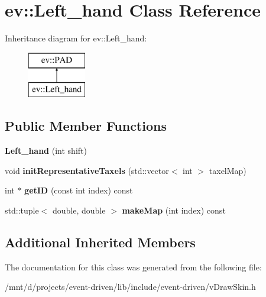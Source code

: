 \hypertarget{classev_1_1Left__hand}{}\section{ev\+:\+:Left\+\_\+hand Class Reference}
\label{classev_1_1Left__hand}
Inheritance diagram for ev\+:\+:Left\+\_\+hand\+:\begin{figure}[H]
\begin{center}
\leavevmode
\includegraphics[height=2.000000cm]{classev_1_1Left__hand}
\end{center}
\end{figure}
\subsection*{Public Member Functions}
\begin{DoxyCompactItemize}
\item 
\mbox{\label{classev_1_1Left__hand_aa0736fa85986f013a2e968f60553f217}} 
{\bfseries Left\+\_\+hand} (int shift)
\item 
\mbox{\label{classev_1_1Left__hand_a47162abd5620f6b2ed6fabce7a8b6060}} 
void {\bfseries init\+Representative\+Taxels} (std\+::vector$<$ int $>$ taxel\+Map)
\item 
\mbox{\label{classev_1_1Left__hand_af7d9dd729c57fa62aab4d6160e2f8f98}} 
int $\ast$ {\bfseries get\+ID} (const int index) const
\item 
\mbox{\label{classev_1_1Left__hand_af270d362a64976a3a3c2df68af747a30}} 
std\+::tuple$<$ double, double $>$ {\bfseries make\+Map} (int index) const
\end{DoxyCompactItemize}
\subsection*{Additional Inherited Members}


The documentation for this class was generated from the following file\+:\begin{DoxyCompactItemize}
\item 
/mnt/d/projects/event-\/driven/lib/include/event-\/driven/v\+Draw\+Skin.\+h\end{DoxyCompactItemize}
